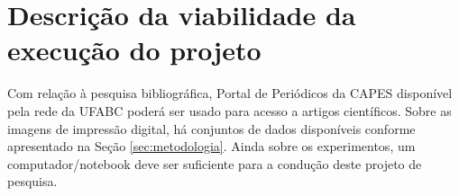 \section{Descrição da viabilidade da execução do projeto}
\label{sec:viabilidade}

Com relação à pesquisa bibliográfica, Portal de Periódicos da CAPES disponível pela rede da UFABC poderá ser usado para acesso a artigos científicos. Sobre as imagens de impressão digital, há conjuntos de dados disponíveis conforme apresentado na Seção \ref{sec:metodologia}. Ainda sobre os experimentos, um computador/notebook deve ser suficiente para a condução deste projeto de pesquisa.